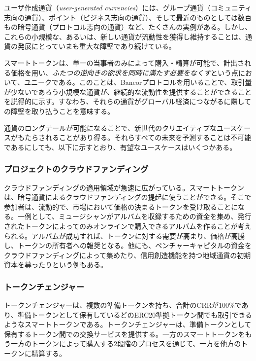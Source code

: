 \documentclass{jsarticle}
\begin{document}
    ユーザ作成通貨（\textit{user-generated currencies}）には、グループ通貨（コミュニティ志向の通貨）、ポイント（ビジネス志向の通貨）、そして最近のものとしては数百もの暗号通貨（プロトコル志向の通貨）など、たくさんの実例がある。しかし、これらの小規模な、あるいは、新しい通貨が流動性を獲得し維持することは、通貨の発展にとっていまも重大な障壁であり続けている。

    スマートトークンは、単一の当事者のみによって購入・精算が可能で、計出される価格を用い、\emph{ふたつの逆向きの欲求を同時に満たす必要をなくす}という点において、ユニークである。このことは、Bancorプロトコルを用いることで、取引量が少ないであろう小規模な通貨が、継続的な流動性を提供することができることを説得的に示す。すなわち、それらの通貨がグローバル経済につながるに際しての障壁を取り払うことを意味する。

    通貨のロングテールが可能になることで、新世代のクリエイティブなユースケースがもたらされることがあり得る。それらすべての未来を予測することは不可能であるにしても、以下に示すとおり、有望なユースケースはいくつかある。

    \subsubsection{プロジェクトのクラウドファンディング}

    クラウドファンディングの適用領域が急速に広がっている。スマートトークンは、暗号通貨によるクラウドファンディングの提起に使うことができる。そこで参加者は、流動的で、市場において価格の決まるトークンを受け取ることになる。一例として、ミュージシャンがアルバムを収録するための資金を集め、発行されたトークンによってのみオンラインで購入できるアルバムを作ることが考えられる。アルバムが成功すれば、トークンに対する需要が高まり、価格が高騰し、トークンの所有者への報奨となる。他にも、ベンチャーキャピタルの資金をクラウドファンディングによって集めたり、信用創造機能を持つ地域通貨の初期資本を募ったりという例もある。

    \subsubsection{トークンチェンジャー}

    トークンチェンジャーは、複数の準備トークンを持ち、合計のCRRが100\%であり、準備トークンとして保有しているどのERC20準拠トークン間でも取引できるようなスマートトークンである。トークンチェンジャーは、準備トークンとして保有するトークン間での交換サービスを提供する。一方のスマートトークンをもう一方のトークンによって購入する2段階のプロセスを通じて、一方を他方のトークンに精算する。
\end{document}
